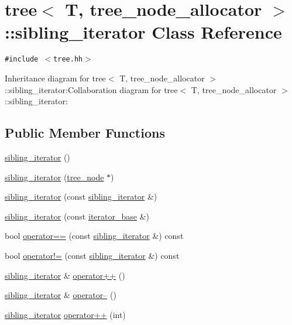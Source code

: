\hypertarget{classtree_1_1sibling__iterator}{
\section{tree$<$ T, tree\_\-node\_\-allocator $>$::sibling\_\-iterator Class Reference}
\label{classtree_1_1sibling__iterator}
}
{\tt \#include $<$tree.hh$>$}

Inheritance diagram for tree$<$ T, tree\_\-node\_\-allocator $>$::sibling\_\-iterator:Collaboration diagram for tree$<$ T, tree\_\-node\_\-allocator $>$::sibling\_\-iterator:\subsection*{Public Member Functions}
\begin{CompactItemize}
\item 
\hyperlink{classtree_1_1sibling__iterator_daaf56c800ed241d36802abab3925a2a}{sibling\_\-iterator} ()
\item 
\hyperlink{classtree_1_1sibling__iterator_7ddfa2fffd76fdd78b97973408a80528}{sibling\_\-iterator} (\hyperlink{classtree__node__}{tree\_\-node} $\ast$)
\item 
\hyperlink{classtree_1_1sibling__iterator_8def7a6f3e109876cb003f4254885ca0}{sibling\_\-iterator} (const \hyperlink{classtree_1_1sibling__iterator}{sibling\_\-iterator} \&)
\item 
\hyperlink{classtree_1_1sibling__iterator_093ea4798a85b0d52e5db20a876bc0d3}{sibling\_\-iterator} (const \hyperlink{classtree_1_1iterator__base}{iterator\_\-base} \&)
\item 
bool \hyperlink{classtree_1_1sibling__iterator_f235d7b64b7d2654437482bab80c797b}{operator==} (const \hyperlink{classtree_1_1sibling__iterator}{sibling\_\-iterator} \&) const 
\item 
bool \hyperlink{classtree_1_1sibling__iterator_2f4b2c5112c9d16f65852bc84d34c9c9}{operator!=} (const \hyperlink{classtree_1_1sibling__iterator}{sibling\_\-iterator} \&) const 
\item 
\hyperlink{classtree_1_1sibling__iterator}{sibling\_\-iterator} \& \hyperlink{classtree_1_1sibling__iterator_8d0d647a7843432b5ccc18724fcc3493}{operator++} ()
\item 
\hyperlink{classtree_1_1sibling__iterator}{sibling\_\-iterator} \& \hyperlink{classtree_1_1sibling__iterator_7e91377755da77acd20d5b9356f7498e}{operator--} ()
\item 
\hyperlink{classtree_1_1sibling__iterator}{sibling\_\-iterator} \hyperlink{classtree_1_1sibling__iterator_66b73e99c5425620a5e282fe23cdfd98}{operator++} (int)

\end{CompactItemize}
